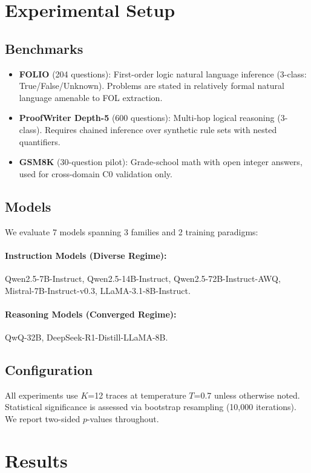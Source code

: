 \documentclass[11pt,a4paper]{article}
\begin{document}
\section{Experimental Setup}

\subsection{Benchmarks}
\begin{itemize}
\item \textbf{FOLIO} (204 questions): First-order logic natural language inference (3-class: True/False/Unknown). Problems are stated in relatively formal natural language amenable to FOL extraction.
\item \textbf{ProofWriter Depth-5} (600 questions): Multi-hop logical reasoning (3-class). Requires chained inference over synthetic rule sets with nested quantifiers.
\item \textbf{GSM8K} (30-question pilot): Grade-school math with open integer answers, used for cross-domain C0 validation only.
\end{itemize}

\subsection{Models}
We evaluate 7 models spanning 3 families and 2 training paradigms:

\paragraph{Instruction Models (Diverse Regime):} Qwen2.5-7B-Instruct, Qwen2.5-14B-Instruct, Qwen2.5-72B-Instruct-AWQ, Mistral-7B-Instruct-v0.3, LLaMA-3.1-8B-Instruct.

\paragraph{Reasoning Models (Converged Regime):} QwQ-32B, DeepSeek-R1-Distill-LLaMA-8B.

\subsection{Configuration}
All experiments use $K$=12 traces at temperature $T$=0.7 unless otherwise noted. Statistical significance is assessed via bootstrap resampling (10,000 iterations). We report two-sided $p$-values throughout.

\section{Results}
\end{document}
